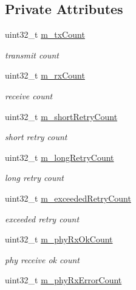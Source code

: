 \subsection*{Private Attributes}
\begin{DoxyCompactItemize}
\item 
uint32\+\_\+t \hyperlink{classns3_1_1AthstatsWifiTraceSink_a345943653ca6423c98ecfa5c9869e6e3}{m\+\_\+tx\+Count}
\begin{DoxyCompactList}\small\item\em transmit count \end{DoxyCompactList}\item 
uint32\+\_\+t \hyperlink{classns3_1_1AthstatsWifiTraceSink_a4ecf47643c96e60bd3e44261abb6da30}{m\+\_\+rx\+Count}
\begin{DoxyCompactList}\small\item\em receive count \end{DoxyCompactList}\item 
uint32\+\_\+t \hyperlink{classns3_1_1AthstatsWifiTraceSink_a584e045801863c0129814a9cbdb84044}{m\+\_\+short\+Retry\+Count}
\begin{DoxyCompactList}\small\item\em short retry count \end{DoxyCompactList}\item 
uint32\+\_\+t \hyperlink{classns3_1_1AthstatsWifiTraceSink_a82893101ecd74542f7860fdf96df9ba5}{m\+\_\+long\+Retry\+Count}
\begin{DoxyCompactList}\small\item\em long retry count \end{DoxyCompactList}\item 
uint32\+\_\+t \hyperlink{classns3_1_1AthstatsWifiTraceSink_ad6a3eab7b3064fbcaac07d7f476448a9}{m\+\_\+exceeded\+Retry\+Count}
\begin{DoxyCompactList}\small\item\em exceeded retry count \end{DoxyCompactList}\item 
uint32\+\_\+t \hyperlink{classns3_1_1AthstatsWifiTraceSink_abecbc84dd7ae1460900505b58dfa8b3a}{m\+\_\+phy\+Rx\+Ok\+Count}
\begin{DoxyCompactList}\small\item\em phy receive ok count \end{DoxyCompactList}\item 
uint32\+\_\+t \hyperlink{classns3_1_1AthstatsWifiTraceSink_ac05a02e26c52753fcbb45885326d9bab}{m\+\_\+phy\+Rx\+Error\+Count}

\end{DoxyCompactItemize}
